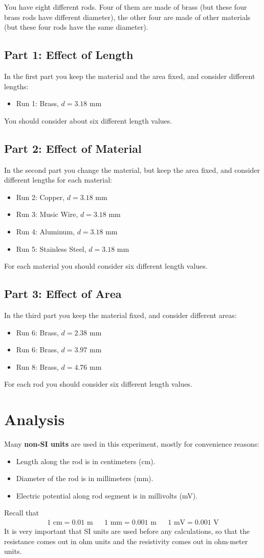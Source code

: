 You have eight different rods. Four of them are made of brass (but these four brass rods have different diameter), the other four are made of other materials (but these four rods have the same diameter).
%
\subsection{Part 1: Effect of Length}
%
In the first part you keep the material and the area fixed, and consider different lengths:
\begin{itemize}
	\item Run 1: Brass, $d = 3.18$ mm
\end{itemize}
You should consider about six different length values.
%
\subsection{Part 2: Effect of Material}
%
In the second part you change the material, but keep the area fixed, and consider different lengths for each material:
\begin{itemize}
	\item Run 2: Copper, $d = 3.18$ mm
	\item Run 3: Music Wire, $d = 3.18$ mm
	\item Run 4: Aluminum, $d = 3.18$ mm
	\item Run 5: Stainless Steel, $d = 3.18$ mm
\end{itemize}
For each material you should consider six different length values.
%
\subsection{Part 3: Effect of Area}
%
In the third part you keep the material fixed, and consider different areas:
\begin{itemize}
	\item Run 6: Brass, $d = 2.38$ mm
	\item Run 6: Brass, $d = 3.97$ mm
	\item Run 8: Brass, $d = 4.76$ mm
\end{itemize}
For each rod you should consider six different length values.
%
\section{Analysis}
%
Many \textbf{non-SI units} are used in this experiment, mostly for convenience reasons:
\begin{itemize}
	\item Length along the rod is in centimeters (cm).
	\item Diameter of the rod is in millimeters (mm).
	\item Electric potential along rod segment is in millivolts (mV).
\end{itemize}
Recall that
\begin{align}
	1 \text{ cm} = 0.01 \text{ m} && 1 \text{ mm} = 0.001 \text{ m} && 1 \text{ mV} = 0.001 \text{ V}
\end{align}
It is very important that SI units are used before any calculations, so that the resistance comes out in ohm units and the resistivity comes out in ohm$\cdot$meter units.
%
